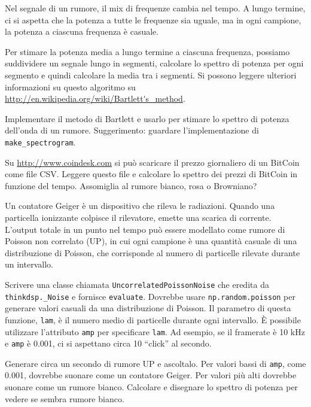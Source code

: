 \documentclass[12pt,a4paper]{book}
\begin{document}
\begin{exercise} Nel segnale di un rumore, il mix di frequenze cambia nel tempo. A lungo termine, ci si aspetta che la potenza a tutte le frequenze sia uguale, ma in ogni campione, la potenza a ciascuna frequenza è casuale.

Per stimare la potenza media a lungo termine a ciascuna frequenza, possiamo suddividere un segnale lungo in segmenti, calcolare lo spettro di potenza per ogni segmento e quindi calcolare la media tra i segmenti. Si possono leggere ulteriori informazioni su questo algoritmo su \url{http://en.wikipedia.org/wiki/Bartlett's_method}.

Implementare il metodo di Bartlett e usarlo per stimare lo spettro di potenza dell'onda di un rumore. Suggerimento: guardare l'implementazione di \verb"make_spectrogram". \end{exercise} 

\begin{exercise} Su \url{http://www.coindesk.com} si può scaricare il prezzo giornaliero di un BitCoin come file CSV. Leggere questo file e calcolare lo spettro dei prezzi di BitCoin in funzione del tempo. Assomiglia al rumore bianco, rosa o Browniano? \end{exercise} 

\begin{exercise} Un contatore Geiger è un dispositivo che rileva le radiazioni. Quando una particella ionizzante colpisce il rilevatore, emette una scarica di corrente. L'output totale in un punto nel tempo può essere modellato come rumore di Poisson non correlato (UP), in cui ogni campione è una quantità casuale di una distribuzione di Poisson, che corrisponde al numero di particelle rilevate durante un intervallo.

Scrivere una classe chiamata {\tt UncorrelatedPoissonNoise} che eredita da \verb"thinkdsp._Noise" e fornisce {\tt evaluate}. Dovrebbe usare {\tt np.random.poisson} per generare valori casuali da una distribuzione di Poisson. Il parametro di questa funzione, {\tt lam}, è il numero medio di particelle durante ogni intervallo. È possibile utilizzare l'attributo {\tt amp} per specificare {\tt lam}. Ad esempio, se il framerate è 10 kHz e {\tt amp} è 0.001, ci si aspettano circa 10 ``click'' al secondo.

Generare circa un secondo di rumore UP e ascoltalo. Per valori bassi di {\tt amp}, come 0.001, dovrebbe suonare come un contatore Geiger. Per valori più alti dovrebbe suonare come un rumore bianco. Calcolare e disegnare lo spettro di potenza per vedere se sembra rumore bianco. \end{exercise} 
\end{document}
